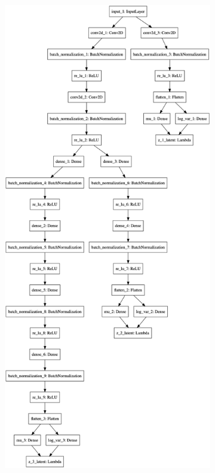 \begin{figure}
    \centering
    \begin{subfigure}{.45\textwidth}
        \centering
        \includegraphics[height=.8\textheight]{images/vlae_encoder.png}

\end{subfigure}
\end{figure}
